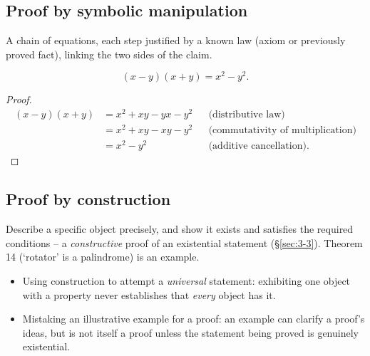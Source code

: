 \subsection{Proof by symbolic manipulation}
\label{sec:3-6}

\begin{note}
A chain of equations, each step justified by a known law (axiom or previously proved fact), linking the two sides of the claim.
\end{note}

\begin{example}
\[
(x-y)(x+y) = x^2 - y^2.
\]
\end{example}
\begin{proof}
\begin{align*}
(x-y)(x+y) &= x^2 + xy - yx - y^2 && \text{(distributive law)} \\
&= x^2 + xy - xy - y^2 && \text{(commutativity of multiplication)} \\
&= x^2 - y^2 && \text{(additive cancellation)}.
\end{align*}
\end{proof}

\subsection{Proof by construction}
\label{sec:3-7}
\begin{note}[Pattern]
Describe a specific object precisely, and show it exists and satisfies the required conditions -- a \emph{constructive} proof of an existential statement (\S\ref{sec:3-3}). Theorem 14 (`rotator' is a palindrome) is an example.
\end{note}

\begin{note}
\begin{itemize}
    \item Using construction to attempt a \emph{universal} statement: exhibiting one object with a property never establishes that \emph{every} object has it.
    \item Mistaking an illustrative example for a proof: an example can clarify a proof's ideas, but is not itself a proof unless the statement being proved is genuinely existential.
\end{itemize}
\end{note}


